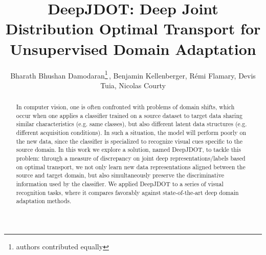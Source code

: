 \documentclass[runningheads]{llncs}
\begin{document}
\pagestyle{headings}



\mainmatter
\def\ECCV18SubNumber{2583}  

\title{DeepJDOT: Deep Joint Distribution Optimal Transport for Unsupervised Domain Adaptation}



\author{Bharath Bhushan Damodaran\thanks{authors contributed equally}\,, Benjamin Kellenberger, R\'emi Flamary, Devis Tuia, Nicolas Courty}



 


\maketitle

\begin{abstract}
In computer vision, one is often confronted with problems of domain shifts, which occur when one applies a classifier trained on a source dataset to target data sharing similar characteristics (e.g. same classes), but also different latent data structures (e.g. different acquisition conditions). In such a situation, the model will perform poorly on the new data, since the classifier is specialized to recognize visual cues specific to the source domain. In this work we explore a solution, named DeepJDOT, to tackle this problem: through a measure of discrepancy on joint deep representations/labels based on optimal transport, we not only learn new data representations aligned between the source and target domain, but also simultaneously preserve the discriminative information used by the classifier.
We applied DeepJDOT to a series of visual recognition tasks, where it compares favorably against state-of-the-art deep domain adaptation methods.
\end{abstract}
\end{document}

